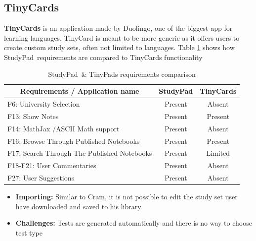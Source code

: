 \documentclass[thesis=B,english]{FITthesis}[2012/10/20]
\newcommand{\appname}{StudyPad}
\begin{document}
\subsection{TinyCards}

\textbf{TinyCards} is an application made by Duolingo, one of the biggest app for learning languages. TinyCard is meant to be more generic as it offers users to create custom study sets, often not limited to languages. Table \ref{tab:tinycards} shows how \appname\ requirements are compared to TinyCards functionality 

\begin{table}[H]
\caption{\appname\ \& TinyPads requirements comparison}
\label{tab:tinycards}
\begin{tabular}{|l|c|c|}
\hline
\multicolumn{1}{|c|}{\textbf{Requirements / Application name}} & \multicolumn{1}{l|}{\textbf{StudyPad}} & \multicolumn{1}{l|}{\textbf{TinyCards}} \\ \hline
F6: University Selection                                       & Present                                & Absent                                  \\ \hline
F13: Show Notes                                                & Present                                & Present                                 \\ \hline
F14: MathJax /ASCII Math support                               & Present                                & Absent                                  \\ \hline
F16: Browse Through Published Notebooks                        & Present                                & Present                                 \\ \hline
F17: Search Through The Published Notebooks                    & Present                                & Limited                                 \\ \hline
F18-F21: User Commentaries                                     & Present                                & Absent                                  \\ \hline
F27: User Suggestions                                          & Present                                & Absent                                  \\ \hline
\end{tabular}
\end{table}


	\begin{itemize}
		\item \textbf{Importing:} Similar to Cram, it is not possible to edit the study set user have downloaded and saved to his library
		\item \textbf{Challenges:} Tests are generated automatically and there is no way to choose test type
	\end{itemize}
	
\end{document}
